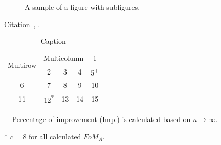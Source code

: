 \documentclass[]{IEEEtran}
\begin{document}
\begin{figure}[!bth] %
\centering
{}
\hfill
{}
\caption{A sample of a figure with subfigures.}
\label{fig_subfigure}
\end{figure}

Citation~\cite{Taherinejad2016_CompObs}, \cite{anzanpour:2017a}.

\begin{table}[!tbh]
    \centering
    \caption{Caption}
    \label{tab:my_label}
    
    \begin{threeparttable}
    \begin{tabular}{|c|c c c | c|}
         \hline
         \multirow{2}{*}{Multirow}  & \multicolumn{3}{c|}{Multicolumn} & 1\\
         \cline{2-5}
          & 2 & 3 & 4 & 5\textsuperscript{+} \\
         \hline \hline
         6 & 7 & 8 & 9 & 10 \\
         11 & 12\textsuperscript{*} & 13 & 14 & 15 \\
         \hline
    \end{tabular}
      \begin{tablenotes}
       \item[+] Percentage of improvement (Imp.) is calculated based on $n \to \infty$.
       \item[*]$c=8$ for all calculated $FoM_A$.
     \end{tablenotes}
     \end{threeparttable}
\end{table}
\end{document}
